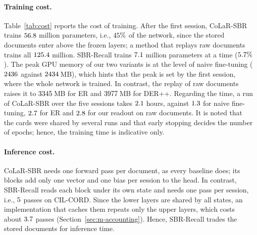 \paragraph{Training cost.} Table~\ref{tab:cost} reports the cost of training. After the
first session, CoLaR-SBR trains $56.8$ million parameters, i.e.,
$45\%$ of the network, since the stored documents enter above the frozen
layers; a method that replays raw documents trains all $125.4$ million. SBR-Recall
trains $7.1$ million parameters at a time ($5.7\%$). The peak
GPU memory of our two variants is at the level of naive fine-tuning ($2436$
against $2434$\,MB), which hints that the peak is set by the first session,
where the whole network is trained. In contrast, the replay of raw documents raises it to $3345$\,MB
for ER and $3977$\,MB for DER++. Regarding the time, a run of CoLaR-SBR over the
five sessions takes $2.1$ hours, against $1.3$ for naive
fine-tuning, $2.7$ for ER and $2.8$ for our readout on raw
documents. It is noted that the cards were shared by several runs and that early stopping
decides the number of epochs; hence, the training time is indicative only.

\begin{table}[!htbp]
  \centering
  \caption[Compute cost on CIL-CORD]{\textbf{Compute cost} on CIL-CORD. Trainable:
  parameters trained at once after the first session, in millions. Peak GPU: over the
  whole run. Training: wall-clock time of one run over the five sessions (mean of three
  runs; indicative, since the cards were shared). Passes: forward passes per test
  document.}
  \label{tab:cost}
  
\end{table}

\paragraph{Inference cost.} CoLaR-SBR needs one forward pass per document, as every
baseline does; its blocks add only one vector and one bias per session to the head. In
contrast, SBR-Recall reads each block under its own state and needs one pass per session,
i.e., $5$ passes on CIL-CORD. Since the lower layers are shared by all
states, an implementation that caches them repeats only the upper layers, which costs about
$3.7$ passes (Section~\ref{sec:m-accounting}). Hence, SBR-Recall trades the
stored documents for inference time.

